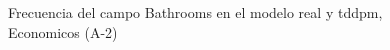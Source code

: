 \begin{figure}[H]
    \centering
    
    \caption{Frecuencia del campo Bathrooms en el modelo real y tddpm, Economicos (A-2)}
    \label{frecuency-Bathrooms-tddpm_mlp}
\end{figure}